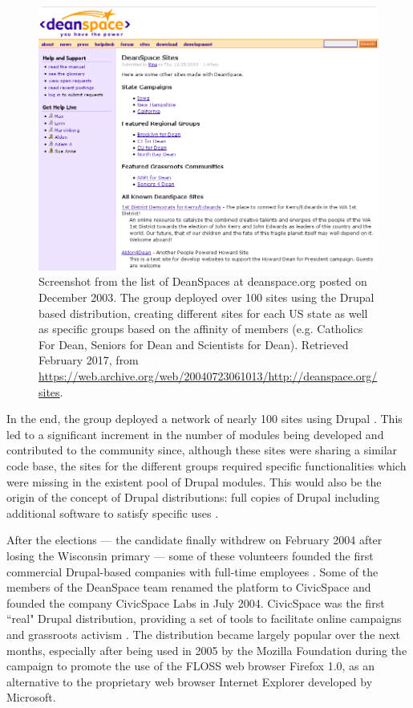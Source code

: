 \begin{figure}[H]
	\centering
	\includegraphics[scale=0.4]{img/deanspace_org.png}
	\caption[DeanSpace.org on  December 2003]%
    {Screenshot from the list of DeanSpaces at deanspace.org posted on  December 2003. The group deployed over 100 sites using the Drupal based distribution, creating different sites for each US state as well as specific groups based on the affinity of members (e.g. Catholics For Dean, Seniors for Dean and Scientists for Dean). Retrieved  February 2017, from \url{https://web.archive.org/web/20040723061013/http://deanspace.org/sites}.}
	\label{deanspace}
\end{figure}

In the end, the group deployed a network of nearly 100 sites using Drupal \parencite{lebkowsky2005deanspace}. This led to a significant increment in the number of modules being developed and contributed to the community \parencite{Cohn2008} since, although these sites were sharing a similar code base, the sites for the different groups required specific functionalities which were missing in the existent pool of Drupal modules. This would also be the origin of the concept of Drupal distributions: full copies of Drupal including additional software to satisfy specific uses \parencite{drupal-distributions:2013:Online}.

After the elections --- the candidate finally withdrew on February 2004 after losing the Wisconsin primary ---  some of these volunteers founded the first commercial Drupal-based companies with full-time employees \parencite{benjamin2011definitive}. Some of the members of the DeanSpace team renamed the platform to CivicSpace and founded the company CivicSpace Labs in July 2004. CivicSpace was the first ``real" Drupal distribution, providing a set of tools to facilitate online campaigns and grassroots activism \parencite{drupal-civicspace:2013:Online}. The distribution became largely popular over the next months, especially after being used in 2005 by the Mozilla Foundation during the campaign to promote the use of the FLOSS web browser Firefox 1.0, as an alternative to the proprietary web browser Internet Explorer developed by Microsoft.

